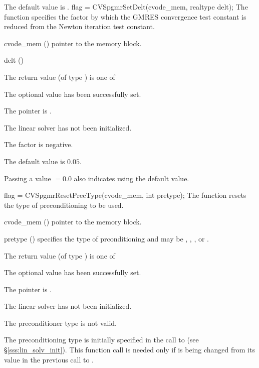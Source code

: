 {
  The default value is .
}
{
  flag = CVSpgmrSetDelt(cvode\_mem, realtype delt);
}
{
  The function  specifies the factor by
  which the GMRES convergence test constant is reduced
  from the Newton iteration test constant.
}
{
  \begin{args}
  \item[cvode\_mem] ()
    pointer to the {\cvode} memory block.
  \item[delt] ()

  \end{args}
}
{
  The return value  (of type ) is one of
  \begin{args}
  \item[\Id{SUCCESS}] 
    The optional value has been successfully set.
  \item[\Id{LIN\_NO\_MEM}]
    The  pointer is .
  \item[\Id{LIN\_NO\_LMEM}]
    The {\cvspgmr} linear solver has not been initialized.
  \item[\Id{LIN\_ILL\_INPUT}]
    The factor  is negative.  
  \end{args}
}
{
  The default value is $0.05$.

  Passing a value $ = 0.0$ also indicates using the default value.
}
{
  flag = CVSpgmrResetPrecType(cvode\_mem, int pretype);
}
{
  The function  resets the type
  of preconditioning to be used.
}
{
  \begin{args}
  \item[cvode\_mem] ()
    pointer to the {\cvode} memory block.
  \item[pretype] ()
    specifies the type of prconditioning and may be
    , , , or .
  \end{args}
}
{
  The return value  (of type ) is one of
  \begin{args}
  \item[\Id{SUCCESS}] 
    The optional value has been successfully set.
  \item[\Id{LIN\_NO\_MEM}]
    The  pointer is .
  \item[\Id{LIN\_NO\_LMEM}]
    The {\cvspgmr} linear solver has not been initialized.
  \item[\Id{LIN\_ILL\_INPUT}]
    The preconditioner type  is not valid.
  \end{args}
}
{
  The preconditioning type is initially specified in the call
  to  (see \S\ref{sss:lin_solv_init}). This function call is
  needed only if  is being changed from its value in the
  previous call to .
}

